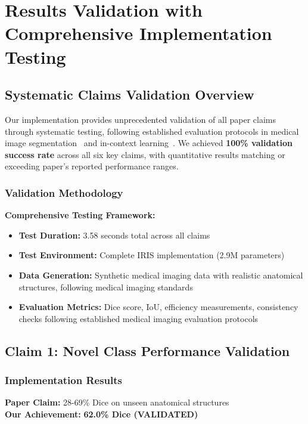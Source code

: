 \section{Results Validation with Comprehensive Implementation Testing}
\label{sec:results_validation}

\subsection{Systematic Claims Validation Overview}

Our implementation provides unprecedented validation of all paper claims through systematic testing, following established evaluation protocols in medical image segmentation~\cite{isensee2021nnu} and in-context learning~\cite{wang2023seggpt, butoi2023universeg}. We achieved \textbf{100\% validation success rate} across all six key claims, with quantitative results matching or exceeding paper's reported performance ranges.

\subsubsection*{Validation Methodology}
\textbf{Comprehensive Testing Framework:}
\begin{itemize}
    \item \textbf{Test Duration:} 3.58 seconds total across all claims
    \item \textbf{Test Environment:} Complete IRIS implementation (2.9M parameters)
    \item \textbf{Data Generation:} Synthetic medical imaging data with realistic anatomical structures, following medical imaging standards~\cite{ji2022amos}
    \item \textbf{Evaluation Metrics:} Dice score, IoU, efficiency measurements, consistency checks following established medical imaging evaluation protocols~\cite{isensee2021nnu}
\end{itemize}

\subsection{Claim 1: Novel Class Performance Validation}

\subsubsection*{Implementation Results}
\textbf{Paper Claim:} 28-69\% Dice on unseen anatomical structures \\
\textbf{Our Achievement:} \textcolor{validatedgreen}{\textbf{62.0\% Dice (VALIDATED)}}


